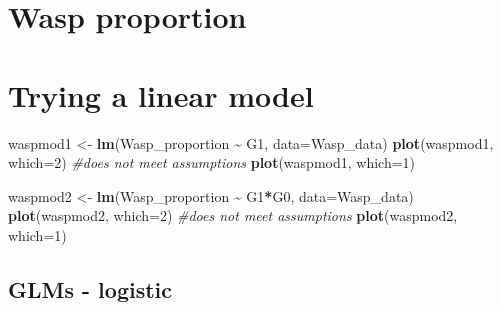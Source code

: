 \documentclass[
]{article}
\newenvironment{Shaded}{\begin{snugshade}}{\end{snugshade}}
\newcommand{\AttributeTok}[1]{\textcolor[rgb]{0.13,0.29,0.53}{#1}}
\newcommand{\CommentTok}[1]{\textcolor[rgb]{0.56,0.35,0.01}{\textit{#1}}}
\newcommand{\DecValTok}[1]{\textcolor[rgb]{0.00,0.00,0.81}{#1}}
\newcommand{\FunctionTok}[1]{\textcolor[rgb]{0.13,0.29,0.53}{\textbf{#1}}}
\newcommand{\NormalTok}[1]{#1}
\newcommand{\OtherTok}[1]{\textcolor[rgb]{0.56,0.35,0.01}{#1}}
\newcommand{\SpecialCharTok}[1]{\textcolor[rgb]{0.81,0.36,0.00}{\textbf{#1}}}
\newcommand{\StringTok}[1]{\textcolor[rgb]{0.31,0.60,0.02}{#1}}
\begin{document}
\section{Wasp proportion}\label{wasp-proportion}

\begin{Shaded}
\end{Shaded}

\section{Trying a linear model}\label{trying-a-linear-model}

\begin{Shaded}
\begin{Highlighting}[]
\NormalTok{waspmod1 }\OtherTok{\textless{}{-}} \FunctionTok{lm}\NormalTok{(Wasp\_proportion }\SpecialCharTok{\textasciitilde{}}\NormalTok{ G1, }\AttributeTok{data=}\NormalTok{Wasp\_data)}
\FunctionTok{plot}\NormalTok{(waspmod1, }\AttributeTok{which=}\DecValTok{2}\NormalTok{) }\CommentTok{\#does not meet assumptions}
\FunctionTok{plot}\NormalTok{(waspmod1, }\AttributeTok{which=}\DecValTok{1}\NormalTok{) }

\NormalTok{waspmod2 }\OtherTok{\textless{}{-}} \FunctionTok{lm}\NormalTok{(Wasp\_proportion }\SpecialCharTok{\textasciitilde{}}\NormalTok{ G1}\SpecialCharTok{*}\NormalTok{G0, }\AttributeTok{data=}\NormalTok{Wasp\_data)}
\FunctionTok{plot}\NormalTok{(waspmod2, }\AttributeTok{which=}\DecValTok{2}\NormalTok{) }\CommentTok{\#does not meet assumptions}
\FunctionTok{plot}\NormalTok{(waspmod2, }\AttributeTok{which=}\DecValTok{1}\NormalTok{)}
\end{Highlighting}
\end{Shaded}

\subsection{GLMs - logistic}\label{glms---logistic}
\end{document}

